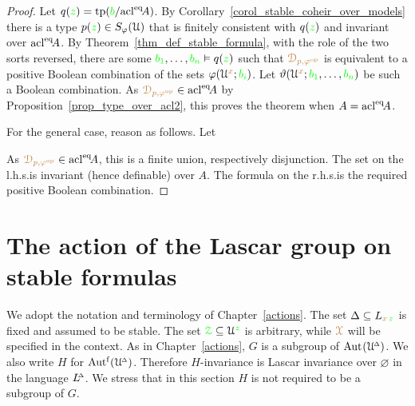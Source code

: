 \begin{proof}
  Let $q({\color{green} z})={\rm tp}({\color{green} b}/{\rm acl}^{{\rm eq}}\!A)$.
  By Corollary~\ref{corol_stable_coheir_over_models} there is a type $p({\color{green} z})\in S_\varphi(\EuScript U)$ that is finitely consistent with $q({\color{green} z})$ and invariant over ${\rm acl}^{{\rm eq}}\!A$.
  By Theorem~\ref{thm_def_stable_formula}, with the role of the two sorts reversed, there are some ${\color{green} b_1},\dots,{\color{green} b_n}\vDash q({\color{green} z})$ such that ${\color{brown}\EuScript D_{p,\varphi^{\rm op}}}$ is equivalent to a positive Boolean combination of the sets $\varphi(\EuScript U^{\color{brown} x};{\color{green} b_i})$.
  Let $\vartheta(\EuScript U^{\color{brown} x};{\color{green} b_1},\dots,{\color{green} b_n})$ be such a Boolean combination.
  As ${\color{brown}\EuScript D_{p,\varphi^{\rm op}}}\in{\rm acl}^{{\rm eq}}\!A$ by Proposition~\ref{prop_type_over_acl2}, this proves the theorem when $A={\rm acl}^{{\rm eq}}\!A$.

  For the general case, reason as follows.
  Let 
  

  As ${\color{brown}\EuScript D_{p,\varphi^{\rm op}}}\in{\rm acl}^{{\rm eq}}\!A$, this is a finite union, respectively disjunction.
  The set on the l.h.s.\@ is invariant (hence definable) over $A$.
  The formula on the r.h.s.\@ is the required positive Boolean combination.
\end{proof}

\section{The action of the Lascar group on stable formulas}\label{Lascar_action}

\def\medrel#1{\parbox[t]{6ex}{$\displaystyle\hfil #1$}}
\def\ceq#1#2#3{\parbox[t]{10ex}{$\displaystyle #1$}\medrel{#2}$\displaystyle  #3$}

\def\DLascar{L\kern-.6ex\raisebox{1.1ex}{\tiny$\Delta$}\kern-.1ex ascar}

We adopt the notation and terminology of Chapter~\ref{actions}.
The set $\Delta\subseteq L_{{\color{brown} x}\,{\color{green} z}}$ is fixed and assumed to be stable.
The set ${\color{green}\EuScript Z}\subseteq\EuScript U^{\color{green} z}$ is arbitrary, while ${\color{brown}\EuScript X}$ will be specified in the context.
As in Chapter~\ref{actions}, \emph{$G$\/} is a subgroup of ${\rm Aut\kern.15ex}(\EuScript U\kern-.2ex^{\scriptscriptstyle\Delta})$.
We also write \emph{$H$\/} for $\mbox{Aut$^{\rm f}$}(\EuScript U\kern-.2ex^{\scriptscriptstyle\Delta})$.
Therefore $H$-invariance is Lascar invariance over $\varnothing$ in the language $L\kern-.5ex^{\scriptscriptstyle\Delta}$.
We stress that in this section $H$ is not required to be a subgroup of $G$.


